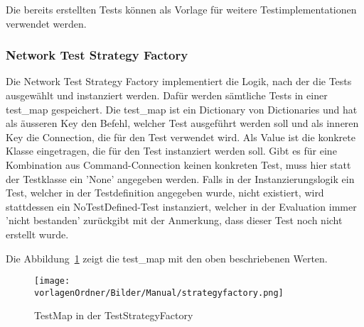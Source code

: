 \documentclass[]{subfiles}
\begin{document}
		Die bereits erstellten Tests können als Vorlage für weitere Testimplementationen verwendet 
		werden.
		
	\subsubsection{Network Test Strategy Factory}
		Die Network Test Strategy Factory implementiert die Logik, nach der die Tests ausgewählt 
		und instanziert werden.
		Dafür werden sämtliche Tests in einer test\_map gespeichert. 
		Die test\_map ist ein Dictionary von Dictionaries und hat als äusseren Key 
		den Befehl, welcher Test ausgeführt werden soll und als inneren Key die Connection,
		die für den Test verwendet wird. 
		Als Value ist die konkrete Klasse eingetragen, die für den Test instanziert werden soll.
		Gibt es für eine Kombination aus Command-Connection keinen konkreten Test, 
		muss hier statt der Testklasse ein 'None' angegeben werden. 
		Falls in der Instanzierungslogik ein Test, welcher in der Testdefinition angegeben wurde,
		nicht existiert, wird stattdessen ein NoTestDefined-Test instanziert, welcher 
		in der Evaluation immer 'nicht bestanden' zurückgibt mit der Anmerkung, dass dieser
		Test noch nicht erstellt wurde.

		Die Abbildung~\ref{fig:TestMap} zeigt die test\_map mit den oben beschriebenen Werten.

		\begin{figure}[h!]
			\begin{center}
		        \texttt{[image: \\vorlagenOrdner/Bilder/Manual/strategyfactory.png]}
				\caption{TestMap in der TestStrategyFactory}
				\label{fig:TestMap}
			\end{center}
		\end{figure}
        
\end{document}
